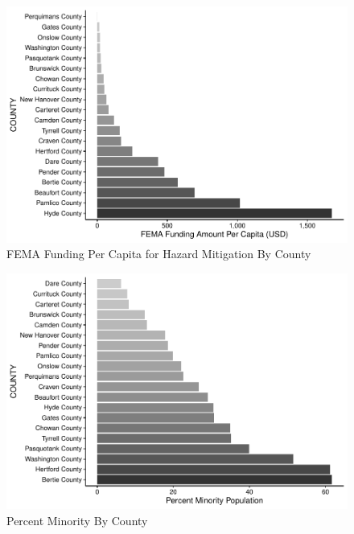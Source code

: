 \documentclass[
  12pt,
]{article}
\begin{document}
\begin{figure}
\centering
\includegraphics{Alexander_ENV872_Project_files/figure-latex/bar chart1-1.pdf}
\caption{FEMA Funding Per Capita for Hazard Mitigation By County}
\end{figure}

\begin{figure}
\centering
\includegraphics{Alexander_ENV872_Project_files/figure-latex/bar chart2-1.pdf}
\caption{Percent Minority By County}
\end{figure}
\end{document}
